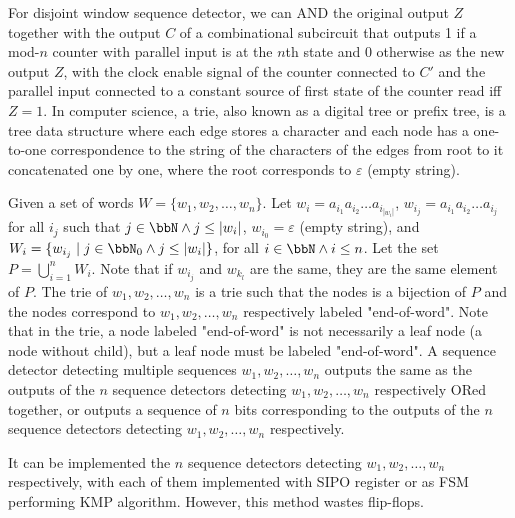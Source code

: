 \documentclass[a4paper,12pt]{report}
\begin{document}
\item For disjoint window sequence detector, we can AND the original output $Z$ together with the output $C$ of a combinational subcircuit that outputs 1 if a mod-$n$ counter with parallel input is at the $n$th state and 0 otherwise as the new output $Z$, with the clock enable signal of the counter connected to $C'$ and the parallel input connected to a constant source of first state of the counter read iff $Z=1$.
\een
{}
In computer science, a trie, also known as a digital tree or prefix tree, is a tree data structure where each edge stores a character and each node has a one-to-one correspondence to the string of the characters of the edges from root to it concatenated one by one, where the root corresponds to $\varepsilon$ (empty string).

Given a set of words $W=\{w_1,w_2,\ldots,w_n\}$. Let $w_i=a_{i_1}a_{i_2}\ldots a_{i_{|w_i|}}$, $w_{i_j}=a_{i_1}a_{i_2}\ldots a_{i_j}$ for all $i_j$ such that $j\in\bbN\land j\leq |w_i|$, $w_{i_0}=\varepsilon$ (empty string), and $W_i=\{w_{i_j}\mid j\in\bbN_0\land j\leq |w_i|\}$, for all $i\in\bbN\land i\leq n$. Let the set $P=\bigcup_{i=1}^nW_i$. Note that if $w_{i_j}$ and $w_{k_l}$ are the same, they are the same element of $P$. The trie of $w_1,w_2,\ldots,w_n$ is a trie such that the nodes is a bijection of $P$ and the nodes correspond to $w_1,w_2,\ldots,w_n$ respectively labeled "end-of-word". Note that in the trie, a node labeled "end-of-word" is not necessarily a leaf node (a node without child), but a leaf node must be labeled "end-of-word".
A sequence detector detecting multiple sequences $w_1,w_2,\ldots,w_n$ outputs the same as the outputs of the $n$ sequence detectors detecting $w_1,w_2,\ldots,w_n$ respectively ORed together, or outputs a sequence of $n$ bits corresponding to the outputs of the $n$ sequence detectors detecting $w_1,w_2,\ldots,w_n$ respectively.

It can be implemented the $n$ sequence detectors detecting $w_1,w_2,\ldots,w_n$ respectively, with each of them implemented with SIPO register or as FSM performing KMP algorithm. However, this method wastes flip-flops.
\end{document}

